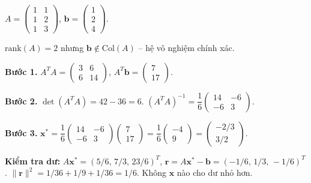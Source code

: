 \documentclass[12pt,a4paper]{article}
\begin{document}
\begin{vidu}[title={Bình phương nhỏ nhất -- ví dụ chi tiết}]
$A = \begin{pmatrix}1&1\\1&2\\1&3\end{pmatrix}$, $\mathbf{b} = \begin{pmatrix}1\\2\\4\end{pmatrix}$.

$\mathrm{rank}(A) = 2$ nhưng $\mathbf{b} \notin \mathrm{Col}(A)$ -- hệ vô nghiệm chính xác.

\textbf{Bước 1.} $A^T A = \begin{pmatrix}3 & 6\\6 & 14\end{pmatrix}$, $A^T \mathbf{b} = \begin{pmatrix}7\\17\end{pmatrix}$.

\textbf{Bước 2.} $\det(A^T A) = 42 - 36 = 6$. $(A^T A)^{-1} = \dfrac{1}{6}\begin{pmatrix}14 & -6\\-6 & 3\end{pmatrix}$.

\textbf{Bước 3.} $\mathbf{x}^* = \dfrac{1}{6}\begin{pmatrix}14 & -6\\-6 & 3\end{pmatrix}\begin{pmatrix}7\\17\end{pmatrix} = \dfrac{1}{6}\begin{pmatrix}-4\\9\end{pmatrix} = \begin{pmatrix}-2/3\\3/2\end{pmatrix}$.

\textbf{Kiểm tra dư:} $A\mathbf{x}^* = (5/6,\, 7/3,\, 23/6)^T$, $\mathbf{r} = A\mathbf{x}^* - \mathbf{b} = (-1/6,\, 1/3,\, -1/6)^T$. $\|\mathbf{r}\|^2 = 1/36 + 1/9 + 1/36 = 1/6$. Không $\mathbf{x}$ nào cho dư nhỏ hơn.
\end{vidu}
\end{document}
